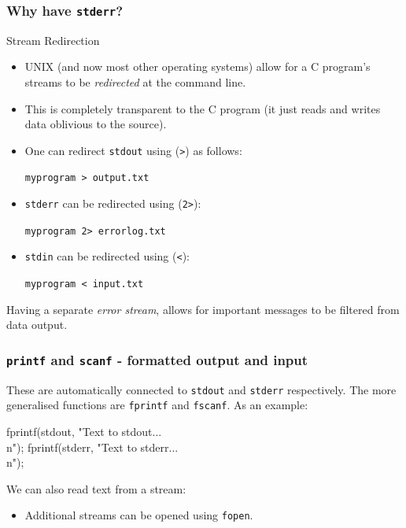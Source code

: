 \documentclass[table]{beamer}
\newif\ifschigh\schighfalse
\newcommand{\kt}[1]{\ifschigh\textcolor{red}{#1}\else\textcolor{ctext}{#1}\fi}
\begin{document}
\begin{frame}
\frametitle{Why have {\tt stderr}?}
\begin{exampleblock}{Stream Redirection}
\begin{itemize}
\item UNIX (and now most other operating systems) allow for a C program's streams to be \emph{redirected} at the command line.
\item This is completely transparent to the C program (it just reads and writes data oblivious to the source).
\item One can redirect {\tt stdout} using ({\tt >}) as follows:
\begin{center}
\tt myprogram > output.txt
\end{center}
\item {\tt stderr} can be redirected using ({\tt 2>}):
\begin{center}
\tt myprogram 2> errorlog.txt
\end{center}
\item {\tt stdin} can be redirected using ({\tt <}):
\begin{center}
\tt myprogram < input.txt
\end{center}
\end{itemize}
\end{exampleblock}
Having a separate \emph{error stream}, allows for important messages to be filtered from data output.
\end{frame}


\begin{frame}[fragile]
\frametitle{{\tt printf} and {\tt scanf} - formatted output and input}
These are automatically connected to {\tt stdout} and {\tt stderr} respectively. The more generalised functions are {\tt fprintf} and {\tt fscanf}. As an example:
\begin{semiverbatim}
fprintf(stdout, \kt{"Text to stdout...\\n"});
fprintf(stderr, \kt{"Text to stderr...\\n"});
\end{semiverbatim}
We can also read text from a stream:
\begin{itemize}
\item Additional streams can be opened using {\tt fopen}.
\end{itemize}
\end{frame}
\end{document}
